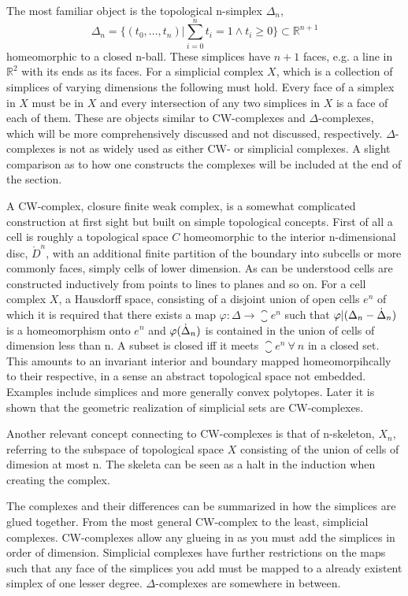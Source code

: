 \documentclass[../../main.tex]{subfiles}
\begin{document}
    The most familiar object is the topological n-simplex $\Delta_n$,
    \begin{equation}
        \Delta_n = \{(t_0, . . . , t_n)  |\sum_{i=0}^{n}t_i=1 \wedge t_i \geq 0\} \subset \mathbb{R}^{n+1}
    \end{equation}
    homeomorphic to a closed n-ball. These simplices have $n+1$ faces, e.g. a line in $\mathbb{R}^2$ with its ends as its faces. For a simplicial complex $X$, which is a collection of simplices of varying dimensions the following must hold. Every face of a simplex in $X$ must be in $X$ and every intersection of any two simplices in $X$ is a face of each of them. These are objects similar to CW-complexes and $\Delta$-complexes, which will be more comprehensively discussed and not discussed, respectively. $\Delta$-complexes is not as widely used as either CW- or simplicial complexes. A slight comparison as to how one constructs the complexes will be included at the end of the section. 
    
    A CW-complex, closure finite weak complex, is a somewhat complicated construction at first sight but built on simple topological concepts. First of all a cell is roughly a topological space $C$ homeomorphic to the interior n-dimensional disc, $\mathring{D}^n$, with an additional finite partition of the boundary into subcells or more commonly faces, simply cells of lower dimension. As can be understood cells are constructed inductively from points to lines to planes and so on. For a cell complex $X$, a Hausdorff space, consisting of a disjoint union of open cells $e^n$ of which it is required that there exists a map $\varphi:\Delta\to\closure{e}^n$ such that $\varphi|(\Delta_n - \dot{\Delta}_n )$ is a homeomorphism onto $e^n$ and $\varphi(\dot{\Delta}_n)$ is contained in the union of cells of dimension less than n. A subset is closed iff it meets $\closure{e}^n\:\forall \:n$ in a closed set. This amounts to an invariant interior and boundary mapped homeomorpihcally to their respective, in a sense an abstract topological space not embedded. Examples include simplices and more generally convex polytopes. Later it is shown that the geometric realization of simplicial sets are CW-complexes.
    
    Another relevant concept connecting to CW-complexes is that of n-skeleton, $X_n$, referring to the subspace of topological space $X$ consisting of the union of cells of dimesion at most n. The skeleta can be seen as a halt in the induction when creating the complex. 

    The complexes and their differences can be summarized in how the simplices are glued together. From the most general CW-complex to the least, simplicial complexes. CW-complexes allow any glueing in as you must add the simplices in order of dimension. Simplicial complexes have further restrictions on the maps such that any face of the simplices you add must be mapped to a already existent simplex of one lesser degree. $\Delta$-complexes are somewhere in between.
    
    
\end{document}
